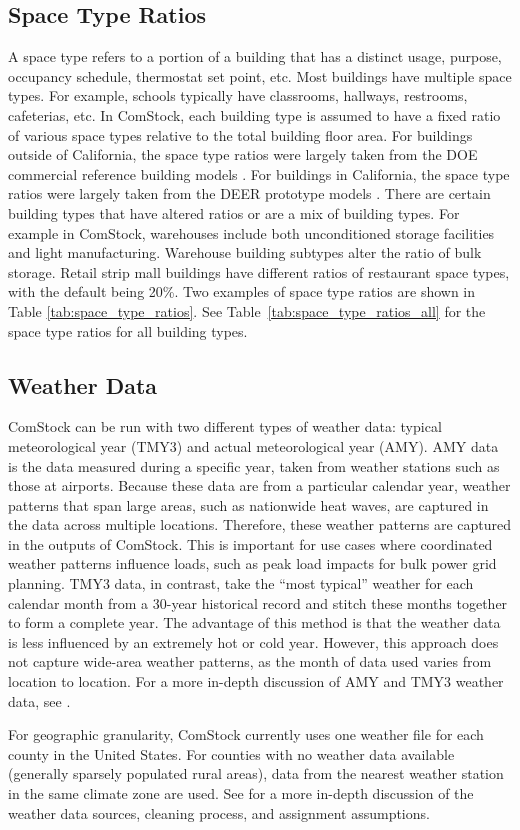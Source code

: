 \subsection{Space Type Ratios}
\label{sec:space_type_ratios}
A space type refers to a portion of a building that has a distinct usage, purpose, occupancy schedule, thermostat set point, etc. Most buildings have multiple space types. For example, schools typically have classrooms, hallways, restrooms, cafeterias, etc. In ComStock, each building type is assumed to have a fixed ratio of various space types relative to the total building floor area. For buildings outside of California, the space type ratios were largely taken from the DOE commercial reference building models \citep{deru_2011}. For buildings in California, the space type ratios were largely taken from the DEER prototype models \citep{cpuc_deer}. There are certain building types that have altered ratios or are a mix of building types. For example in ComStock, warehouses include both unconditioned storage facilities and light manufacturing. Warehouse building subtypes alter the ratio of bulk storage. Retail strip mall buildings have different ratios of restaurant space types, with the default being 20\%. Two examples of space type ratios are shown in Table \ref{tab:space_type_ratios}. See Table~\ref{tab:space_type_ratios_all} for the space type ratios for all building types.



\subsection{Weather Data}
ComStock can be run with two different types of weather data: typical meteorological year (TMY3) and actual meteorological year (AMY). AMY data is the data measured during a specific year, taken from weather stations such as those at airports. Because these data are from a particular calendar year, weather patterns that span large areas, such as nationwide heat waves, are captured in the data across multiple locations. Therefore, these weather patterns are captured in the outputs of ComStock. This is important for use cases where coordinated weather patterns influence loads, such as peak load impacts for bulk power grid planning. TMY3 data, in contrast, take the ``most typical'' weather for each calendar month from a 30-year historical record and stitch these months together to form a complete year. The advantage of this method is that the weather data is less influenced by an extremely hot or cold year. However, this approach does not capture wide-area weather patterns, as the month of data used varies from location to location. For a more in-depth discussion of AMY and TMY3 weather data, see \cite{eulp_final_report}.

For geographic granularity, ComStock currently uses one weather file for each county in the United States. For counties with no weather data available (generally sparsely populated rural areas), data from the nearest weather station in the same climate zone are used. See \citep{eulp_final_report} for a more in-depth discussion of the weather data sources, cleaning process, and assignment assumptions.
